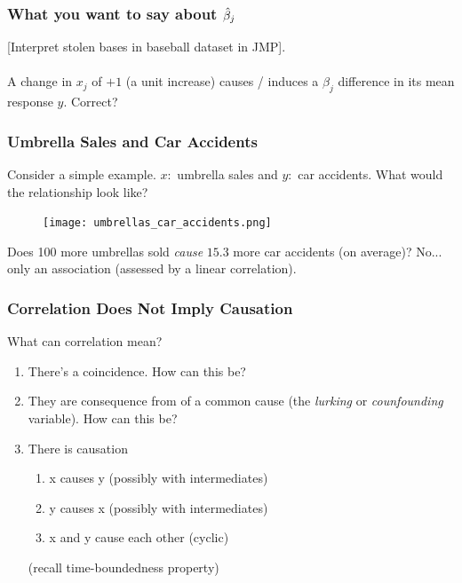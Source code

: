 \documentclass[slides]{beamer} %
\begin{document}
\begin{frame}\frametitle{What you want to say about $\hat{\beta}_j$}

[Interpret stolen bases in baseball dataset in JMP].\\~\\

A change in $x_j$ of $+1$ (a unit increase) causes / induces a $\beta_j$ difference in its mean response $y$. Correct?

\end{frame}


\begin{frame}\frametitle{Umbrella Sales and Car Accidents}

Consider a simple example. $x:$ umbrella sales and $y:$ car accidents. What would the relationship look like? \pause

\begin{figure}
\centering
\texttt{[image: umbrellas\_car\_accidents.png]}
\end{figure}

Does 100 more umbrellas sold \textit{cause} $15.3$ more car accidents (on average)? \pause No... only an association (assessed by a linear correlation).

\end{frame}

\begin{frame}\frametitle{Correlation Does Not Imply Causation}

What can correlation mean?

\begin{enumerate}
\item There's a coincidence. How can this be?
\item They are consequence from of a common cause (the \emph{lurking} or \emph{counfounding} variable). How can this be?
\item There is causation \pause
\begin{enumerate}
\item x causes y (possibly with intermediates)
\item y causes x (possibly with intermediates)
\item x and y cause each other (cyclic)
\end{enumerate}
(recall time-boundedness property)
\end{enumerate}

\end{frame}
\end{document}
